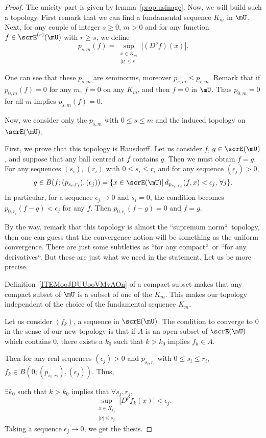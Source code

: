 \begin{proof}
 The unicity part is given by lemma~\ref{prop:usinage}. Now, we will build such a topology. First remark that we can find a fundamental sequence $K_m$ in $\mU$. Next, for any couple of integer $s\geq 0$, $m>0$ and for any function $f\in\scrE^{(r)}(\mU)$ with $r\geq s$, we define
\[
   p_{s,m}(f)=\sup_{\substack{ x\in K_m\\|\nu|\leq s}}|(D^{\nu}f)(x)|.
\]

One can see that these $p_{s,m}$ are seminorms, moreover $p_{s,m}\leq p_{r,m}$. Remark that if $p_{0,m}(f)=0$ for any $m$, $f=0$ on any $K_m$, and then $f=0$ in $\mU$. Thus $p_{0,m}=0$ for all $m$ implies $p_{s,m}(f)=0$.

Now, we consider only the $p_{s,m}$ with $0\leq s\leq m$ and the induced topology on $\scrE(\mU)$.

First, we prove that this topology is Hausdorff. Let us consider $f$, $g\in\scrE(\mU)$, and suppose that any ball centred at $f$ contains $g$. Then we must obtain $f=g$. For any sequences $(s_i)$, $(r_i)$ with $0\leq s_i\leq r_i$ and for any sequence $(\epsilon_j)>0$,
\[
  g\in B(f;(p_{s_i,r_i}),(\epsilon_j))=
          \{ x\in\scrE(\mU)|\, d_{p_{s_i,r_i}}(f,x)<\epsilon_j,\,\forall j \}.
\]
In particular, for a sequence $\epsilon_j\to 0$ and $s_i=0$, the condition becomes $p_{0,r_i}(f-g)<\epsilon_j$ for any $f$. Then $p_{0,r_i}(f-g)=0$ and $f=g$.

By the way, remark that this topology is almost the ``supremum norm``\ topology, then one can guess that the convergence notion will be something as the uniform convergence. There are just some subtleties as ``for any compact``\ or ``for any derivatives``. But these are just what we need in the statement. Let us be more precise.

Definition~\ref{ITEMooJDUUooVMvAOn} of a compact subset makes that any compact subset of $\mU$ is a subset of one of the $K_m$. This makes our topology independent of the choice of the fundamental sequence $K_m$.

Let us consider $(f_k)$, a sequence in $\scrE(\mU)$. The condition to converge to $0$ in the sense of our new topology is that if $A$ is an open subset of $\scrE(\mU)$ which contains $0$, there exists a $k_0$ such that $k>k_0$ implies $f_k\in A$.

Then for any real sequences $(\epsilon_j)>0$ and $p_{s_i,r_i}$ with $0\leq s_i\leq r_i$, $f_k\in B( 0;(p_{s_i,r_i}),(\epsilon_j) )$. Thus,

$\exists k_0$ such that $k>k_0$ implies that $\forall s_j,r_j$,
\[
   \sup_{ \substack{ x\in K_{r_j}\\|\nu|\leq s_j } }|D^{\nu}f_k(x)|<\epsilon_j.
\]
Taking a sequence $\epsilon_j\to 0$, we get the thesis.
\end{proof}


